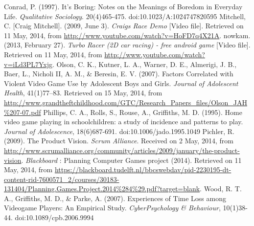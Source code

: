 \documentclass[11pt,twoside,a4paper]{article}
\begin{document}
Conrad, P. (1997). It's Boring: Notes on the Meanings of Boredom in Everyday Life. \textit{Qualitative Sociology}. 20(4)465-475. doi:10.1023/A:1024747820595
\newline \newline
Mitchell, C. [Craig Mitchell]. (2009, June 3). \textit{Craigs Race Demo} [Video file]. Retrieved on 11 May, 2014, from \url{http://www.youtube.com/watch?v=HoFD7q4X21A}.
\newline \newline
nowkam. (2013, February 27). \textit{Turbo Racer (2D car racing) - free android game} [Video file]. Retrieved on 11 May, 2014, from \url{http://www.youtube.com/watch?v=iLd3PL7Yxjg}.
\newline \newline
Olson, C. K., Kutner, L. A., Warner, D. E., Almerigi, J. B., Baer, L., Nicholi II, A. M., \& Beresin, E. V. (2007). Factors Correlated with Violent Video Game Use by Adolescent Boys and Girls. \textit{Journal of Adolescent Health}, 41(1)77–83. Retrieved on 15 May, 2014, from \url{http://www.grandtheftchildhood.com/GTC/Research_Papers_files/Olson_JAH%207-07.pdf}
\newline \newline
Phillips, C. A., Rolls, S., Rouse, A., Griffiths, M. D. (1995). Home video game playing in schoolchildren: a study of incidence and patterns to play. \textit{Journal of Adolescence}, 18(6)687-691. doi:10.1006/jado.1995.1049
\newline \newline
Pichler, R. (2009). The Product Vision. \textit{Scrum Alliance}. Received on 2 May, 2014, from \url{http://www.scrumalliance.org/community/articles/2009/january/the-product-vision}.
\newline \newline
\textit{Blackboard} : Planning Computer Games project (2014). Retrieved on 11 May, 2014, from \url{https://blackboard.tudelft.nl/bbcswebdav/pid-2230195-dt-content-rid-7600571_2/courses/30183-131404/Planning.Games.Project.2014%284%29.pdf?target=blank}.
\newline \newline
Wood, R. T. A., Griffiths, M. D., \& Parke, A. (2007). Experiences of Time Loss among Videogame Players: An Empirical Study. \textit{CyberPsychology \& Behaviour}, 10(1)38-44. doi:10.1089/cpb.2006.9994
\end{document}
